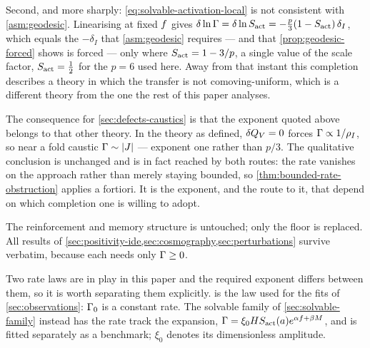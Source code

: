\begin{remark}
  Second, and more sharply: \cref{eq:solvable-activation-local} is not
  consistent with \cref{asm:geodesic}. Linearising at fixed $f$ gives
  $\delta\ln\Gamma=\delta\ln S_{\mathrm{act}}=-\tfrac{p}{3}(1-S_{\mathrm{act}})\,\delta_I$, which equals
  the $-\delta_I$ that \cref{asm:geodesic} requires --- and that
  \cref{prop:geodesic-forced} shows is forced --- only where
  $S_{\mathrm{act}}=1-3/p$, a single value of the scale factor, $S_{\mathrm{act}}=\tfrac12$ for the
  $p=6$ used here. Away from that instant this completion describes a theory in
  which the transfer is not comoving-uniform, which is a different theory from
  the one the rest of this paper analyses.

  The consequence for \cref{sec:defects-caustics} is that the exponent quoted
  above belongs to that other theory. In the theory as defined, $\delta Q_{V}=0$
  forces $\Gamma\propto1/\rho_{I}$, so near a fold caustic $\Gamma\sim\left|J\right|$ ---
  exponent one rather than $p/3$. The qualitative conclusion is unchanged and
  is in fact reached by both routes: the rate vanishes on the approach rather
  than merely staying bounded, so \cref{thm:bounded-rate-obstruction} applies a
  fortiori. It is the exponent, and the route to it, that depend on which
  completion one is willing to adopt.
\end{remark}

The reinforcement and memory structure is untouched; only the floor is
replaced. All results of
\cref{sec:positivity-ide,sec:cosmography,sec:perturbations} survive verbatim,
because each needs only $\Gamma\ge0$.

Two rate laws are in play in this paper and the required exponent differs
between them, so it is worth separating them explicitly.
 is the law used for the fits of
\cref{sec:observations}: $\Gamma_{0}$ is a constant rate. The solvable family of
\cref{sec:solvable-family} instead has the rate track the expansion,
$\Gamma=\xi_0HS_{\mathrm{act}}(a)e^{\alpha f+\beta M}$, and is fitted separately
as a benchmark; $\xi_0$ denotes its dimensionless amplitude.

